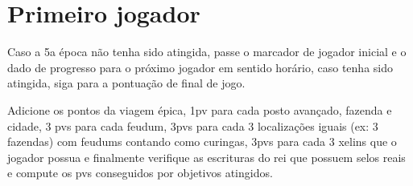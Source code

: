 \documentclass[11pt]{article}
\begin{document}
\section{Primeiro jogador}
\label{sec:orgheadline11}

Caso a 5a época não tenha sido atingida, passe o marcador de jogador inicial e o dado de progresso para o próximo jogador em sentido horário, caso tenha sido atingida, siga para
a pontuação de final de jogo.

Adicione os pontos da viagem épica, 1pv para cada posto avançado, fazenda e cidade, 3 pvs para cada feudum, 3pvs para cada 3 localizações iguais (ex: 3 fazendas) com feudums contando como
curingas, 3pvs para cada 3 xelins que o jogador possua e finalmente verifique as escrituras do rei que possuem selos reais e compute os pvs conseguidos por objetivos atingidos.
\end{document}
